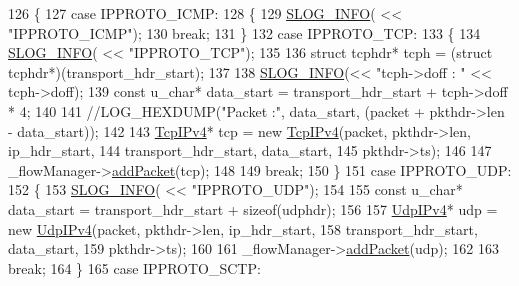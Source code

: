 \begin{DoxyCode}
{{126         \{
127             \textcolor{keywordflow}{case} IPPROTO\_ICMP:
128             \{
129                 \hyperlink{_logger_8h_a119c1c29ba35a8db38e2358e41167282}{SLOG\_INFO}( << \textcolor{stringliteral}{"IPPROTO\_ICMP"});
130                 \textcolor{keywordflow}{break};
131             \}
132             \textcolor{keywordflow}{case} IPPROTO\_TCP:
133             \{
134                 \hyperlink{_logger_8h_a119c1c29ba35a8db38e2358e41167282}{SLOG\_INFO}( << \textcolor{stringliteral}{"IPPROTO\_TCP"});
135 
136                 \textcolor{keyword}{struct }tcphdr* tcph = (\textcolor{keyword}{struct }tcphdr*)(transport\_hdr\_start);
137 
138                 \hyperlink{_logger_8h_a119c1c29ba35a8db38e2358e41167282}{SLOG\_INFO}(<< \textcolor{stringliteral}{"tcph->doff : "} << tcph->doff);
139                 \textcolor{keyword}{const} u\_char* data\_start = transport\_hdr\_start  + tcph->doff * 4;
140 
141                 \textcolor{comment}{//LOG\_HEXDUMP("Packet :", data\_start, (packet + pkthdr->len - data\_start));}
142                 
143                 \hyperlink{class_vsid_common_1_1_tcp_i_pv4}{TcpIPv4}* tcp = \textcolor{keyword}{new} \hyperlink{class_vsid_common_1_1_tcp_i_pv4}{TcpIPv4}(packet, pkthdr->len, ip\_hdr\_start, 
144                                                 transport\_hdr\_start, data\_start, 
145                                                 pkthdr->ts);
146 
147                 \_flowManager->\hyperlink{class_vsid_common_1_1_flow_manager_a9c840fe2a6650079a3b90ba2d65f1e7e}{addPacket}(tcp);
148 
149                 \textcolor{keywordflow}{break};
150             \}
151             \textcolor{keywordflow}{case} IPPROTO\_UDP:
152             \{
153                 \hyperlink{_logger_8h_a119c1c29ba35a8db38e2358e41167282}{SLOG\_INFO}( << \textcolor{stringliteral}{"IPPROTO\_UDP"});
154 
155                 \textcolor{keyword}{const} u\_char* data\_start = transport\_hdr\_start + \textcolor{keyword}{sizeof}(udphdr);
156 
157                 \hyperlink{class_vsid_common_1_1_udp_i_pv4}{UdpIPv4}* udp = \textcolor{keyword}{new} \hyperlink{class_vsid_common_1_1_udp_i_pv4}{UdpIPv4}(packet, pkthdr->len, ip\_hdr\_start, 
158                                             transport\_hdr\_start, data\_start, 
159                                             pkthdr->ts);
160 
161                 \_flowManager->\hyperlink{class_vsid_common_1_1_flow_manager_a9c840fe2a6650079a3b90ba2d65f1e7e}{addPacket}(udp);
162 
163                 \textcolor{keywordflow}{break};
164             \}
165             \textcolor{keywordflow}{case} IPPROTO\_SCTP:
}}
\end{DoxyCode}
